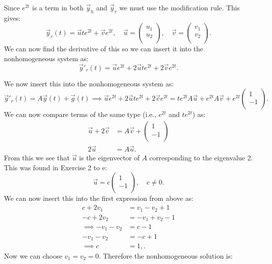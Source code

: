 Since $e^{2t}$ is a term in both $\Vec{y}_h$ and $\Vec{y}_r$ we must use the modification rule. This gives:
\[ 
\Vec{y}_r(t) = \Vec{u} t e^{2t} + \Vec{v} e^{2t}, \quad \Vec{u} = \begin{pmatrix}
u_1\\
u_2\\
\end{pmatrix}, \quad \Vec{v} = \begin{pmatrix}
v_1\\
v_2\\
\end{pmatrix}
.\]
We can now find the derivative of this so we can insert it into the nonhomogeneous system as:
\[ 
\Vec{y}'_r(t) = \Vec{u} e^{2t} + 2 \Vec{u} t e^{2t} + 2 \Vec{v} e^{2t}
.\]

We now insert this into the nonhomogeneous system as:
\[ 
\Vec{y}'_r (t) = A \Vec{y}(t) + \Vec{g}(t) \implies \Vec{u} e^{2t} + 2 \Vec{u} t e^{2t} + 2 \Vec{v} e^{2t} = t e^{2t} A \Vec{u} + e^{2t} A \Vec{v}  + e^{2t} \begin{pmatrix}
1\\
-1\\
\end{pmatrix}
.\]
We can now compare terms of the same type (i.e., $e^{2t}$ and $te^{2t}$) as:
\begin{align*}
  \Vec{u} + 2 \Vec{v} &= A \Vec{v} + \begin{pmatrix}
  1\\
  -1\\
  \end{pmatrix}\\
  2 \Vec{u} &= A \Vec{u}
.\end{align*}
From this we see that $\Vec{u}$ is the eigenvector of $A$ corresponding to the eigenvalue 2. This was found in Exercise 2 to e:
\[ 
\Vec{u} = c\begin{pmatrix}
1\\
-1\\
\end{pmatrix}, \quad c \neq 0
.\]
We can now insert this into the first expression from above as:
\begin{align*}
  c + 2 v_1 &= v_1 - v_2 + 1\\
  -c + 2 v_2 &= - v_1 + v_2 -1 \\
  \implies - v_1 - v_2 &= c - 1 \\
  -v_1 - v_2 &= -c + 1 \\
  \implies c &= 1,
.\end{align*}
Now we can choose $v_1 = v_2 = 0$. Therefore the nonhomogeneous solution is:
